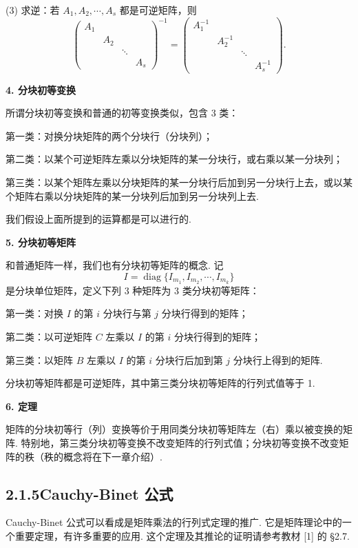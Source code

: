 \documentclass[UTF8,12pt,a4paper,fontset=fandol]{ctexart}
\begin{document}
(3) 求逆：若 $A_1,A_2,\cdots,A_s$ 都是可逆矩阵，则
\[
\left(
\begin{array}{cccc}
A_1 & & &\\
& A_2 & &\\
& & \ddots &\\
& & & A_s
\end{array}
\right)^{-1}
=
\left(
\begin{array}{cccc}
A_1^{-1} & & &\\
& A_2^{-1} & &\\
& & \ddots &\\
& & & A_s^{-1}
\end{array}
\right).
\]

\noindent\textbf{4. 分块初等变换}

所谓分块初等变换和普通的初等变换类似，包含 3 类：

第一类：对换分块矩阵的两个分块行（分块列）；

第二类：以某个可逆矩阵左乘以分块矩阵的某一分块行，或右乘以某一分块列；

第三类：以某个矩阵左乘以分块矩阵的某一分块行后加到另一分块行上去，或以某个矩阵右乘以分块矩阵的某一分块列后加到另一分块列上去.

我们假设上面所提到的运算都是可以进行的.

\noindent\textbf{5. 分块初等矩阵}

和普通矩阵一样，我们也有分块初等矩阵的概念. 记
\[
I=\operatorname{diag}\{I_{m_1},I_{m_2},\cdots,I_{m_k}\}
\]
是分块单位矩阵，定义下列 3 种矩阵为 3 类分块初等矩阵：

第一类：对换 $I$ 的第 $i$ 分块行与第 $j$ 分块行得到的矩阵；

第二类：以可逆矩阵 $C$ 左乘以 $I$ 的第 $i$ 分块行得到的矩阵；

第三类：以矩阵 $B$ 左乘以 $I$ 的第 $i$ 分块行后加到第 $j$ 分块行上得到的矩阵.

分块初等矩阵都是可逆矩阵，其中第三类分块初等矩阵的行列式值等于 1.

\noindent\textbf{6. 定理}

矩阵的分块初等行（列）变换等价于用同类分块初等矩阵左（右）乘以被变换的矩阵. 特别地，第三类分块初等变换不改变矩阵的行列式值；分块初等变换不改变矩阵的秩（秩的概念将在下一章介绍）.

\subsection*{2.1.5\quad Cauchy-Binet 公式}

Cauchy-Binet 公式可以看成是矩阵乘法的行列式定理的推广. 它是矩阵理论中的一个重要定理，有许多重要的应用. 这个定理及其推论的证明请参考教材 [1] 的 §2.7.
\end{document}
